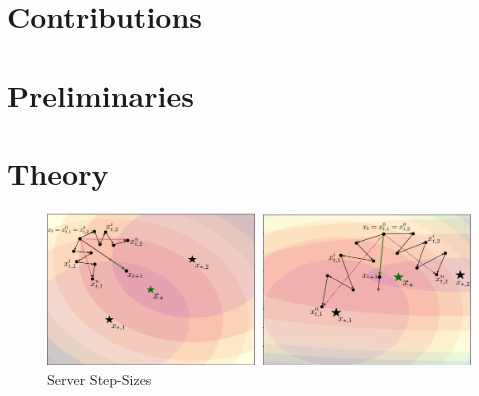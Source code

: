 \documentclass{article}
\begin{document}
\section{Contributions}
\label{sec:headings}




\section{Preliminaries}


\section{Theory}
\begin{figure}[h]
\centering
{\includegraphics[scale=0.3]{figures/ServerStep.png} \\ Server Step-Sizes}
\end{figure}
\end{document}
